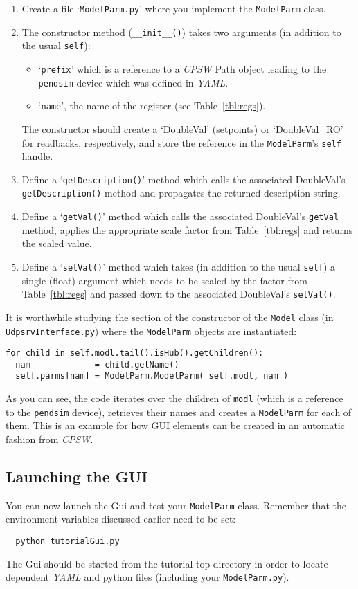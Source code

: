 \documentclass[10pt]{article}
\newcommand{\ita}[1]{\emph{#1}}
\newcommand{\cpsw}      {\ita {CPSW}}
\newcommand{\yaml}      {\ita {YAML}}
\newcommand{\Path}      {{Path}}
\newcommand{\py}        {python}
\newcommand{\cod}[1] {{\tt#1}}
\begin{document}
\begin{enumerate}
\item Create a file `\cod{ModelParm.py}' where you implement the \cod{\mbox{ModelParm}} class.
\item The constructor method (\cod{\_\_init\_\_()}) takes two arguments (in addition
      to the usual \cod{self}):
    \begin{itemize}
    \item `\cod{prefix}' which is a reference to a \cpsw{} \Path{} object leading
          to the \cod{pendsim} device which was defined in \yaml{}.
    \item `\cod{name}', the name of the register (see Table~\ref{tbl:regs}).
    \end{itemize}
    The constructor should create a `DoubleVal' (setpoints) or `DoubleVal\_RO' for
    readbacks, respectively, and store the reference in the \cod{\mbox{ModelParm}}'s
    \cod{self} handle.
\item Define a `\cod{getDescription()}' method which calls the associated DoubleVal's
    \cod{getDescription()} method and propagates the returned description string.
\item Define a `\cod{getVal()}' method which calls the associated DoubleVal's
    \cod{getVal} method, applies the appropriate scale factor from Table~\ref{tbl:regs}
    and returns the scaled value.
\item Define a `\cod{setVal()}' method which takes (in addition to the usual \cod{self})
    a single (float) argument which needs to be scaled by the factor from
    Table~\ref{tbl:regs} and passed down to the associated DoubleVal's \cod{setVal()}.
\end{enumerate}

It is worthwhile studying the section of the constructor of the \cod{Model} class
(in \cod{UdpsrvInterface.py}) where the \cod{\mbox{ModelParm}} objects are instantiated:
\begin{verbatim}
for child in self.modl.tail().isHub().getChildren():
  nam             = child.getName()
  self.parms[nam] = ModelParm.ModelParm( self.modl, nam )
\end{verbatim}
As you can see, the code iterates over the children of \cod{modl} (which is
a reference to the \cod{pendsim} device), retrieves their names and creates
a \cod{\mbox{ModelParm}} for each of them. This is an example for how GUI elements
can be created in an automatic fashion from \cpsw{}.

\subsection{Launching the GUI}
You can now launch the Gui and test your \cod{\mbox{ModelParm}} class. Remember that the
environment variables discussed earlier need to be set:
\begin{verbatim}
  python tutorialGui.py
\end{verbatim}
The Gui should be started from the tutorial top directory in order to locate
dependent \yaml{} and \py{} files (including your \cod{\mbox{ModelParm.py}}).
\end{document}
